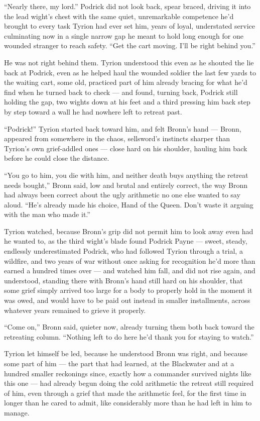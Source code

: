 “Nearly there, my lord.” Podrick did not look back, spear braced, driving it into the lead wight’s chest with the same quiet, unremarkable competence he’d brought to every task Tyrion had ever set him, years of loyal, understated service culminating now in a single narrow gap he meant to hold long enough for one wounded stranger to reach safety. “Get the cart moving. I’ll be right behind you.”

He was not right behind them. Tyrion understood this even as he shouted the lie back at Podrick, even as he helped haul the wounded soldier the last few yards to the waiting cart, some old, practiced part of him already bracing for what he’d find when he turned back to check — and found, turning back, Podrick still holding the gap, two wights down at his feet and a third pressing him back step by step toward a wall he had nowhere left to retreat past.

“Podrick!” Tyrion started back toward him, and felt Bronn’s hand — Bronn, appeared from somewhere in the chaos, sellsword’s instincts sharper than Tyrion’s own grief-addled ones — close hard on his shoulder, hauling him back before he could close the distance.

“You go to him, you die with him, and neither death buys anything the retreat needs bought,” Bronn said, low and brutal and entirely correct, the way Bronn had always been correct about the ugly arithmetic no one else wanted to say aloud. “He’s already made his choice, Hand of the Queen. Don’t waste it arguing with the man who made it.”

Tyrion watched, because Bronn’s grip did not permit him to look away even had he wanted to, as the third wight’s blade found Podrick Payne — sweet, steady, endlessly underestimated Podrick, who had followed Tyrion through a trial, a wildfire, and two years of war without once asking for recognition he’d more than earned a hundred times over — and watched him fall, and did not rise again, and understood, standing there with Bronn’s hand still hard on his shoulder, that some grief simply arrived too large for a body to properly hold in the moment it was owed, and would have to be paid out instead in smaller installments, across whatever years remained to grieve it properly.

\sceneBreak

“Come on,” Bronn said, quieter now, already turning them both back toward the retreating column. “Nothing left to do here he’d thank you for staying to watch.”

Tyrion let himself be led, because he understood Bronn was right, and because some part of him — the part that had learned, at the Blackwater and at a hundred smaller reckonings since, exactly how a commander survived nights like this one — had already begun doing the cold arithmetic the retreat still required of him, even through a grief that made the arithmetic feel, for the first time in longer than he cared to admit, like considerably more than he had left in him to manage.

